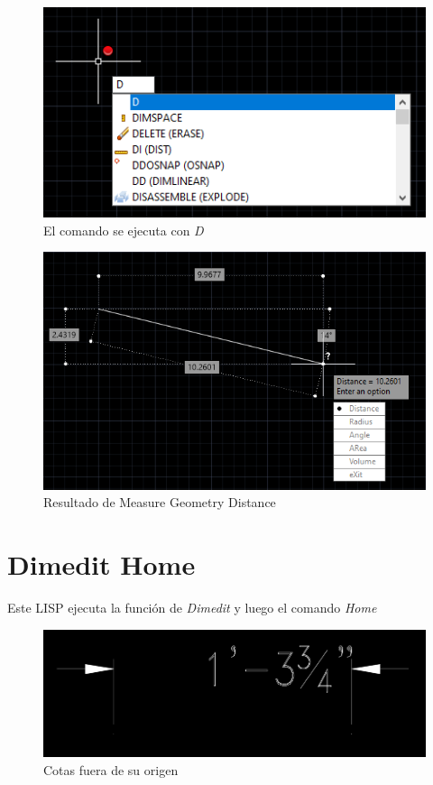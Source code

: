 \documentclass[12pt,letterpaper,final]{report}
\begin{document}
\begin{figure}[H]
	\centering
	\includegraphics[width=0.85\linewidth, height=0.5\textheight,keepaspectratio]{Imagenes/autocad_measuregeom04}
	\caption{El comando se ejecuta con \emph{D}}
	\label{fig:autocadmeasuregeom04}
\end{figure}

\begin{figure}[H]
	\centering
	\includegraphics[width=0.85\linewidth, height=0.5\textheight,keepaspectratio]{Imagenes/autocad_measuregeom05}
	\caption{Resultado de Measure Geometry Distance}
	\label{fig:autocadmeasuregeom05}
\end{figure}

\section{Dimedit Home}
Este LISP ejecuta la función de \emph{Dimedit} y luego el comando \emph{Home}

\begin{figure}[H]
	\centering
	\includegraphics[width=0.65\linewidth, height=0.5\textheight,keepaspectratio]{Imagenes/autocad_dimedithome_01}
	\caption{Cotas fuera de su origen}
	\label{fig:autocaddimedithome01}
\end{figure}
\end{document}
